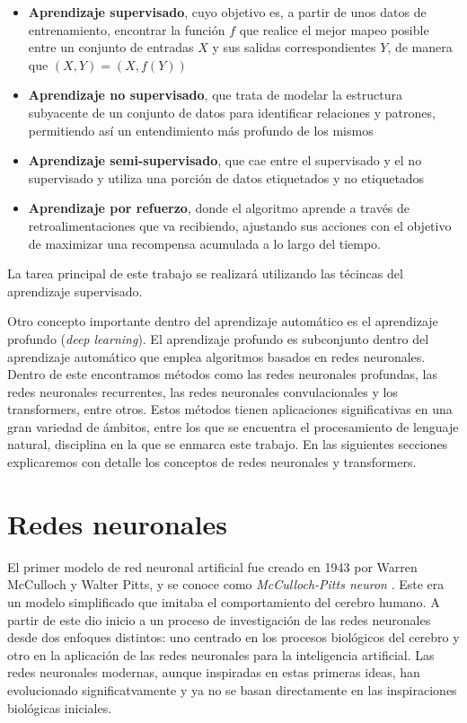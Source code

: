 \documentclass[11pt,spanish,listoffigures,listoftables]{tfgetsinf}
\begin{document}
\begin{itemize}
	\item \textbf{Aprendizaje supervisado}, cuyo objetivo es, a partir de unos datos de entrenamiento, encontrar la función $f$ que realice el mejor mapeo posible entre un conjunto de entradas $X$ y sus salidas correspondientes $Y$, de manera que $(X, Y) = (X, f(Y))$
	\item \textbf{Aprendizaje no supervisado}, que trata de modelar la estructura subyacente de un conjunto de datos para identificar relaciones y patrones, permitiendo así un entendimiento más profundo de los mismos
	\item \textbf{Aprendizaje semi-supervisado}, que cae entre el supervisado y el no supervisado y utiliza una porción de datos etiquetados y no etiquetados
	\item \textbf{Aprendizaje por refuerzo}, donde el algoritmo aprende a través de retroalimentaciones que va recibiendo, ajustando sus acciones con el objetivo de maximizar una recompensa acumulada a lo largo del tiempo. \cite{mirtaheri2022machine}

\end{itemize}

La tarea principal de este trabajo se realizará utilizando las técincas del aprendizaje supervisado.

Otro concepto importante dentro del aprendizaje automático es el aprendizaje profundo (\textit{deep learning}). El aprendizaje profundo es subconjunto dentro del aprendizaje automático que emplea algoritmos basados en redes neuronales. Dentro de este encontramos métodos como las redes neuronales profundas, las redes neuronales recurrentes, las redes neuronales convulacionales y los transformers, entre otros. Estos métodos tienen aplicaciones significativas en una gran variedad de ámbitos, entre los que se encuentra el procesamiento de lenguaje natural, disciplina en la que se enmarca este trabajo. En las siguientes secciones explicaremos con detalle los conceptos de redes neuronales y transformers.

\section{Redes neuronales}

El primer modelo de red neuronal artificial fue creado en 1943 por Warren McCulloch y Walter Pitts, y se conoce como \textit{McCulloch-Pitts neuron} \cite{mcculloch1943logical}. Este era un modelo simplificado que imitaba el comportamiento del cerebro humano. A partir de este dio inicio a un proceso de investigación de las redes neuronales desde dos enfoques distintos: uno centrado en los procesos biológicos del cerebro y otro en la aplicación de las redes neuronales para la inteligencia artificial. Las redes neuronales modernas, aunque inspiradas en estas primeras ideas, han evolucionado significatvamente y ya no se basan directamente en las inspiraciones biológicas iniciales.
\end{document}
